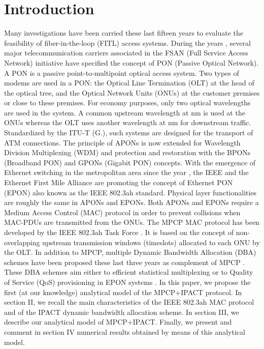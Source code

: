 \documentclass[a4paper,10pt]{IEEEtran}
\begin{document}
\section{Introduction}
Many investigations have been carried these last fifteen years to
evaluate the feasibility of fiber-in-the-loop (FITL) access systems.
During the years , several major telecommunication carriers
associated in the FSAN (Full Service Access Network) initiative have
specified the concept of PON (Passive Optical Network). A PON is a
passive point-to-multipoint optical access system. Two types of
modems are used in a PON: the Optical Line Termination (OLT) at the
head of the optical tree, and the Optical Network Units (ONUs) at
the customer premises or close to these premises. For economy
purposes, only two optical wavelengths are used in the system. A
common upstream wavelength at  nm is used at the ONUs whereas
the OLT uses another wavelength at  nm for downstream traffic.
Standardized by the ITU-T (G.), such systems are designed for
the transport of ATM connections. The principle of APONs is now
extended for Wavelength Division Multiplexing (WDM) and protection
and restoration with the BPONs (Broadband PON) and GPONs (Gigabit
PON) concepts. With the emergence of Ethernet switching in the
metropolitan area since the year , the IEEE and the Ethernet
First Mile Alliance are promoting the concept of Ethernet PON (EPON)
also known as the IEEE 802.3ah standard. Physical layer
functionalities are roughly the same in APONs and EPONs. Both APONs
and EPONs require a Medium Access Control (MAC) protocol in order to
prevent collisions when MAC-PDUs are transmitted from the ONUs. The
MPCP MAC protocol has been developed by the IEEE 802.3ah Task Force
\cite{MPCP:IEEE}. It is based on the concept of non-overlapping
upstream transmission windows (timeslots) allocated to each ONU by
the OLT. In addition to MPCP, multiple Dynamic Bandwidth Allocation
(DBA) schemes have been proposed these last three years as
complement of MPCP \cite{Kramer:FQSE, Ma:2003}. These DBA schemes
aim either to efficient statistical multiplexing or to Quality of
Service (QoS) provisioning in EPON systems \cite{McGarry:2004}. In
this paper, we propose the first (at our knowledge) analytical model
of the MPCP+IPACT protocol. In section II, we recall the main
characteristics of the IEEE 802.3ah MAC protocol and of the IPACT
dynamic bandwidth allocation scheme. In section III, we describe our
analytical model of MPCP+IPACT. Finally, we present and comment in
section IV numerical results obtained by means of this analytical
model.
\end{document}
